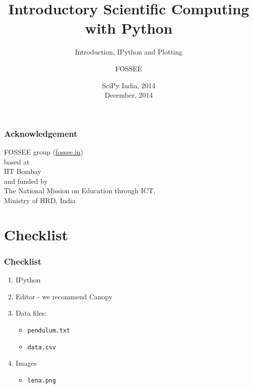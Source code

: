 \documentclass[14pt,compress]{beamer}
\title[Interactive Plotting]{Introductory Scientific Computing with
Python}
\subtitle{Introduction, IPython and Plotting}
\author[FOSSEE group] {FOSSEE}
\institute[IIT Bombay] {Department of Aerospace Engineering\\IIT Bombay}
\date[] {SciPy India, 2014\\
December, 2014
}
\newcommand{\typ}[1]{\lstinline{#1}}
\begin{document}
\begin{frame}
  \maketitle
\end{frame}


\begin{frame}
    \frametitle{Acknowledgement}
    \Large
    \begin{center}
        \alert{FOSSEE group (\url{fossee.in})} \\
        based at\\ 
        \alert{IIT Bombay}\\
        and funded by\\
        The National Mission on Education through ICT, \\
        \alert{Ministry of HRD, India}
    \end{center}
\end{frame}

\section{Checklist}
\begin{frame}
\frametitle{Checklist}
  \begin{enumerate}
    \item IPython
    \item Editor - we recommend \alert{Canopy}
    \item Data files: 
      \begin{itemize}
      \item \typ{pendulum.txt}
      \item \typ{data.csv}
      \end{itemize}
    \item Images
      \begin{itemize}
      \item \typ{lena.png}
      \end{itemize}
  \end{enumerate}
\end{frame}
\end{document}
